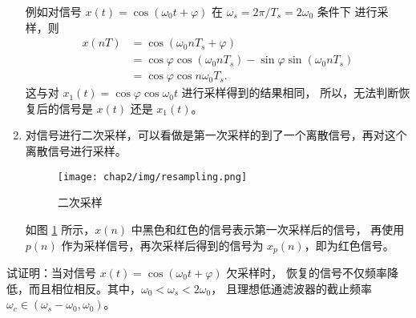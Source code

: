 \begin{definition}[欠采样]
\begin{enumerate}
            例如对信号 $x(t) = \cos(\omega_0 t + \varphi)$ 在 $\omega_s = 2\pi/T_s = 2\omega_0$ 条件下
            进行采样，则
            \begin{align*}
                x(nT) & = \cos(\omega_0 nT_s + \varphi) \\
                & = \cos\varphi\cos(\omega_0 nT_s) - \sin\varphi\sin(\omega_0 nT_s) \\
                & = \cos\varphi\cos n\omega_0 T_s.
            \end{align*}
            这与对 $x_1(t) = \cos\varphi\cos\omega_0 t$ 进行采样得到的结果相同，
            所以，无法判断恢复后的信号是 $x(t)$ 还是 $x_1(t)$。        
        \item 对信号进行二次采样，可以看做是第一次采样的到了一个离散信号，再对这个离散信号进行采样。
            \begin{figure}[H]
                \centering
                \texttt{[image: chap2/img/resampling.png]}
                \caption{二次采样}
                \label{fig:resampling.png}
            \end{figure}
            如图 \ref{fig:resampling.png} 所示，$x(n)$ 中黑色和红色的信号表示第一次采样后的信号，
            再使用 $p(n)$ 作为采样信号，再次采样后得到的信号为 $x_p(n)$，即为红色信号。
    \end{enumerate}
\end{definition}

\begin{homework}
    试证明：当对信号 $x(t) = \cos(\omega_0 t + \varphi)$ 欠采样时，
    恢复的信号不仅频率降低，而且相位相反。其中，$\omega_0 < \omega_s < 2\omega_0$，
    且理想低通滤波器的截止频率 $\omega_c \in (\omega_s - \omega_0, \omega_0)$。
\end{homework}

